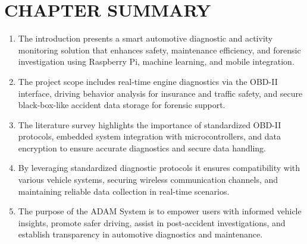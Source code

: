 \section{CHAPTER SUMMARY}
\begin{enumerate}
    \item The introduction presents a smart automotive diagnostic and activity monitoring solution that enhances safety, maintenance efficiency, and forensic investigation using Raspberry Pi, machine learning, and mobile integration.
    \item The project scope includes real-time engine diagnostics via the OBD-II interface, driving behavior analysis for insurance and traffic safety, and secure black-box-like accident data storage for forensic support.
    \item The literature survey highlights the importance of standardized OBD-II protocols, embedded system integration with microcontrollers, and data encryption to ensure accurate diagnostics and secure data handling.
    \item By leveraging standardized diagnostic protocols it ensures compatibility with various vehicle systems, securing wireless communication channels, and maintaining reliable data collection in real-time scenarios.
    \item The purpose of the ADAM System is to empower users with informed vehicle insights, promote safer driving, assist in post-accident investigations, and establish transparency in automotive diagnostics and maintenance.
\end{enumerate}